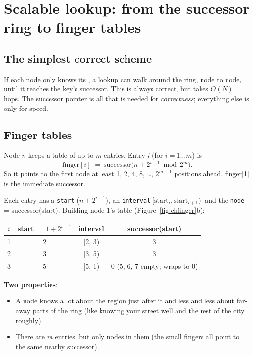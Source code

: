 \section{Scalable lookup: from the successor ring to finger tables}

\subsection{The simplest correct scheme}
If each node only knows its , a lookup can walk around the ring, node to node, until it reaches the key's successor. This is
always correct, but takes $O(N)$ hops. The successor pointer is all that is needed for \emph{correctness}; everything else is only for speed.

\subsection{Finger tables}

\begin{keybox}
Node $n$ keeps a table of up to $m$ entries. Entry $i$ (for $i = 1 \dots m$) is
\[
\text{finger}[i] \;=\; \text{successor}\big(n + 2^{i-1} \bmod 2^m\big).
\]
So it points to the first node at least 1, 2, 4, 8, \dots, $2^{m-1}$ positions ahead. finger[1] is the immediate successor.
\end{keybox}


Each entry has a \texttt{start} ($n + 2^{i-1}$), an \texttt{interval} $[\text{start}_i, \text{start}_{i+1})$, and the \texttt{node} = successor(start).
Building node 1's table (Figure~\ref{fig:chfinger}b):
\begin{center}
\begin{tabular}{@{}cccc@{}}
\toprule
$i$ & start $= 1 + 2^{i-1}$ & interval & successor(start)\\
\midrule
1 & 2 & [2, 3) & 3\\
2 & 3 & [3, 5) & 3\\
3 & 5 & [5, 1) & 0 (5, 6, 7 empty; wraps to 0)\\
\bottomrule
\end{tabular}
\end{center}

\textbf{Two properties}:
\begin{itemize}
  \item A node knows a lot about the region just after it and less and less about far-away parts of the ring (like knowing your street well and the
        rest of the city roughly).
  \item There are $m$ entries, but only  nodes in them (the small fingers all point to the same nearby successor).
\end{itemize}

